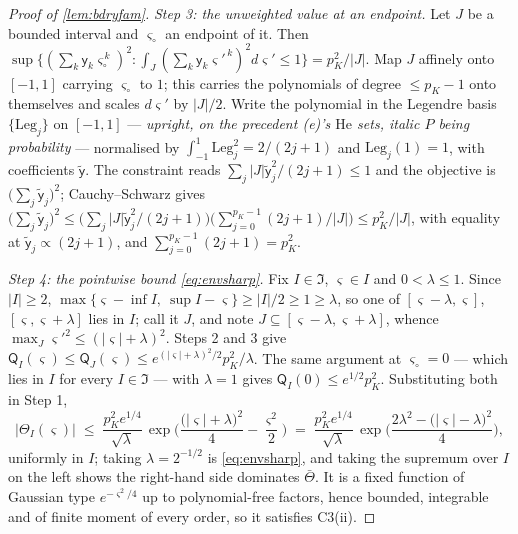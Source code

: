 \begin{proof}[Proof of \cref{lem:bdryfam}]
\emph{Step 3: the unweighted value at an endpoint.} Let $J$ be a bounded interval and $\varsigma_\circ$
an endpoint of it. Then
$\sup\{(\sum_k\mathsf y_k\varsigma_\circ^{\,k})^{2}:\int_J(\sum_k\mathsf y_k\varsigma'^{\,k})^{2}
d\varsigma'\le1\}=p_K^{2}/|J|$. Map $J$ affinely onto $[-1,1]$ carrying $\varsigma_\circ$ to $1$; this
carries the polynomials of degree $\le p_K-1$ onto themselves and scales $d\varsigma'$ by $|J|/2$. Write
the polynomial in the Legendre basis $\{\mathrm{Leg}_j\}$ on $[-1,1]$ --- \emph{upright, on the precedent
\textup{(e)}'s $\mathrm{He}$ sets, italic $P$ being probability} --- normalised by
$\int_{-1}^{1}\mathrm{Leg}_j^{2}=2/(2j+1)$ and $\mathrm{Leg}_j(1)=1$, with coefficients
$\tilde{\mathsf y}$. The constraint reads $\sum_j|J|\tilde{\mathsf y}_j^{2}/(2j+1)\le1$ and the objective
is $\big(\sum_j\tilde{\mathsf y}_j\big)^{2}$; Cauchy--Schwarz gives
$\big(\sum_j\tilde{\mathsf y}_j\big)^{2}\le\big(\sum_j|J|\tilde{\mathsf y}_j^{2}/(2j+1)\big)
\big(\sum_{j=0}^{p_K-1}(2j+1)/|J|\big)\le p_K^{2}/|J|$, with equality at
$\tilde{\mathsf y}_j\propto(2j+1)$, and $\sum_{j=0}^{p_K-1}(2j+1)=p_K^{2}$.

\emph{Step 4: the pointwise bound \eqref{eq:envsharp}.} Fix $I\in\mathfrak I$, $\varsigma\in I$ and
$0<\lambda\le1$. Since $|I|\ge2$, $\max\{\varsigma-\inf I,\ \sup I-\varsigma\}\ge|I|/2\ge1\ge\lambda$,
so one of $[\varsigma-\lambda,\varsigma]$, $[\varsigma,\varsigma+\lambda]$ lies in $I$; call it $J$, and
note $J\subseteq[\varsigma-\lambda,\varsigma+\lambda]$, whence $\max_{J}\varsigma'^{2}\le(|\varsigma|+\lambda)^{2}$.
Steps 2 and 3 give $\mathsf Q_I(\varsigma)\le\mathsf Q_J(\varsigma)\le
e^{(|\varsigma|+\lambda)^{2}/2}p_K^{2}/\lambda$. The same argument at $\varsigma_\circ=0$ --- which lies
in $I$ for every $I\in\mathfrak I$ --- with $\lambda=1$ gives $\mathsf Q_I(0)\le e^{1/2}p_K^{2}$.
Substituting both in Step 1,
\begin{equation*}
\big|\Theta_I(\varsigma)\big|\;\le\;\frac{p_K^{2}e^{1/4}}{\sqrt\lambda}\,
\exp\Big(\frac{\big(|\varsigma|+\lambda\big)^{2}}{4}-\frac{\varsigma^{2}}{2}\Big)
\;=\;\frac{p_K^{2}e^{1/4}}{\sqrt\lambda}\,
\exp\Big(\frac{2\lambda^{2}-\big(|\varsigma|-\lambda\big)^{2}}{4}\Big),
\end{equation*}
uniformly in $I$; taking $\lambda=2^{-1/2}$ is \eqref{eq:envsharp}, and taking the supremum over $I$ on
the left shows the right-hand side dominates $\bar\Theta$. It is a fixed function of Gaussian type
$e^{-\varsigma^{2}/4}$ up to polynomial-free factors, hence bounded, integrable and of finite moment of
every order, so it satisfies C3(ii).


\end{proof}
